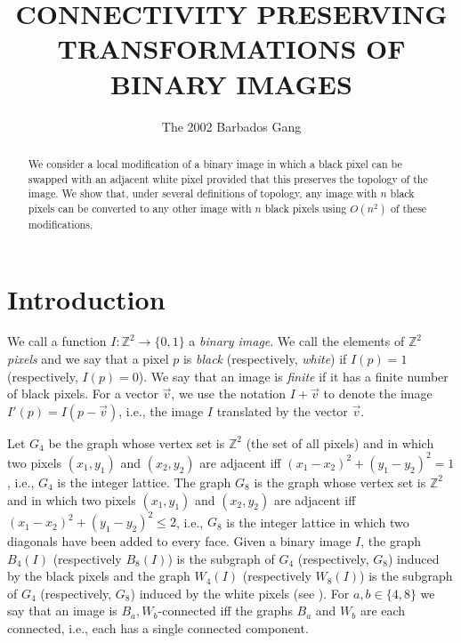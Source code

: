 \documentclass[lotsofwhite,charterfonts]{patmorin}
\title{\MakeUppercase{Connectivity Preserving Transformations 
	of Binary Images}}
\author{The 2002 Barbados Gang}
\date{}
\newcommand{\Z}{\mathbb{Z}}
\begin{document}
\maketitle

\begin{abstract} 
We consider a local modification of a binary image
in which a black pixel can be swapped with an adjacent white pixel
provided that this preserves the topology of the image.  We show that,
under several definitions of topology, any image with $n$ black pixels
can be converted to any other image with $n$ black pixels using
$O(n^2)$ of these modifications.  
\end{abstract}

\section{Introduction}

We call a function $I:\Z^2\rightarrow\{0,1\}$ a \emph{binary image}.
We call the elements of $\Z^2$ \emph{pixels} and we say that a pixel
$p$ is \emph{black} (respectively, \emph{white}) if $I(p)=1$
(respectively, $I(p)=0$).  We say that an image is \emph{finite} if it
has a finite number of black pixels.  For a vector $\vec{v}$, we use
the notation $I+\vec{v}$ to denote the image $I'(p) = I(p-\vec{v})$,
i.e., the image $I$ translated by the vector $\vec{v}$.

Let $G_4$ be the graph whose vertex set is $\Z^2$ (the set of all
pixels) and in which two pixels $(x_1,y_1)$ and $(x_2,y_2)$ are
adjacent iff $(x_1-x_2)^2+(y_1-y_2)^2=1$, i.e., $G_4$ is the integer
lattice.  The graph $G_8$ is the graph whose vertex set is $\Z^2$ and
in which two pixels $(x_1,y_1)$ and $(x_2,y_2)$ are adjacent iff
$(x_1-x_2)^2+(y_1-y_2)^2\le 2$, i.e., $G_8$ is the integer lattice in
which two diagonals have been added to every face.  Given a binary
image $I$, the graph $B_4(I)$ (respectively $B_8(I)$) is the subgraph
of $G_4$ (respectively, $G_8$) induced by the black pixels and the
graph $W_4(I)$ (respectively $W_8(I)$) is the subgraph of $G_4$
(respectively, $G_8$) induced by the white pixels (see
). For $a,b\in\{4,8\}$ we say that an image is
$B_a,W_b$-connected iff the graphs $B_a$ and $W_b$ are each connected,
i.e., each has a single connected component.
\end{document}
